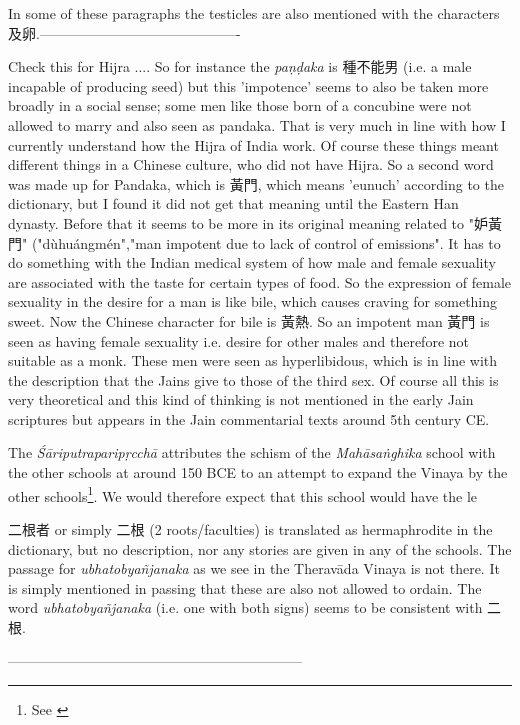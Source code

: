  In some of these paragraphs the testicles are also mentioned with the characters 及卵.-------------------------------------------


Check this for Hijra .... 
So for instance the {\em paṇḍaka} is 種不能男 (i.e. a male incapable of producing seed) but this 'impotence' seems to also be taken more broadly in a social sense; some men like those born of a concubine were not allowed to marry and also seen as pandaka. That is very much in line with how I currently understand how the Hijra of India work. Of course these things meant different things in a Chinese culture, who did not have Hijra. So a second word was made up for Pandaka, which is 黃門, which means 'eunuch' according to the dictionary, but I found it did not get that meaning until the Eastern Han dynasty. Before that it seems to be more in its original meaning related to "妒黃門" ("dùhuángmén","man impotent due to lack of control of emissions". It has to do something with the Indian medical system of how male and female sexuality are associated with the taste for certain types of food. So the expression of female sexuality in the desire for a man is like bile, which causes craving for something sweet. Now the Chinese character for bile is 黃熱. So an impotent man 黃門 is seen as having female sexuality i.e. desire for other males and therefore not suitable as a monk. These men were seen as hyperlibidous, which is in line with the description that the Jains give to those of the third sex. Of course all this is very theoretical and this kind of thinking is not mentioned in the early Jain scriptures but appears in the Jain commentarial texts around 5th century CE. 


The {\em Śāriputraparipṛcchā} attributes the schism of the {\em Mahāsaṅghika} school with the other schools at around 150 BCE to an attempt to expand the Vinaya by the other schools\footnote{See \cite{sujato2012}}. We would therefore expect that this school would have the le



二根者 or simply 二根 (2 roots/faculties) is translated as hermaphrodite in the dictionary, but no description, nor any stories are given in any of the schools. The passage for {\em ubhatob­yañ­janaka} as we see in the Theravāda Vinaya is not there. It is simply mentioned in passing that these are also not allowed to ordain. The word {\em ubhatob­yañ­janaka} (i.e. one with both signs) seems to be consistent with 二根.



---------------------------------------------------------------


